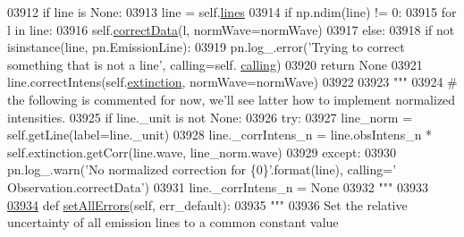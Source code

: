 \begin{DoxyCode}
{{{{{{{{{{{{{{{{{{{{{{03912         \textcolor{keywordflow}{if} line \textcolor{keywordflow}{is} \textcolor{keywordtype}{None}:
03913             line = self.\hyperlink{classpyneb_1_1core_1_1pynebcore_1_1_observation_a78332043ca9f290590edf6b8a1e5b767}{lines}
03914         \textcolor{keywordflow}{if} np.ndim(line) != 0:
03915             \textcolor{keywordflow}{for} l \textcolor{keywordflow}{in} line:
03916                 self.\hyperlink{classpyneb_1_1core_1_1pynebcore_1_1_observation_a823a1fa51f042f2734cbc323c6a7d4bb}{correctData}(l, normWave=normWave)
03917         \textcolor{keywordflow}{else}:
03918             \textcolor{keywordflow}{if} \textcolor{keywordflow}{not} isinstance(line, pn.EmissionLine):
03919                 pn.log\_.error(\textcolor{stringliteral}{'Trying to correct something that is not a line'}, calling=self.
      \hyperlink{classpyneb_1_1core_1_1pynebcore_1_1_observation_a2639fad9af4fefad20e4097295bd40e7}{calling})
03920                 \textcolor{keywordflow}{return} \textcolor{keywordtype}{None}  
03921             line.correctIntens(self.\hyperlink{classpyneb_1_1core_1_1pynebcore_1_1_observation_acdd6227c32bd92ec4a15b83110bcb570}{extinction}, normWave=normWave)
03922 
03923             \textcolor{stringliteral}{"""            }
03924 \textcolor{stringliteral}{            # the following is commented for now, we'll see latter how to implement normalized intensities.}
03925 \textcolor{stringliteral}{            if line.\_unit is not None:}
03926 \textcolor{stringliteral}{                try:}
03927 \textcolor{stringliteral}{                    line\_norm = self.getLine(label=line.\_unit)}
03928 \textcolor{stringliteral}{                    line.\_corrIntens\_n = line.obsIntens\_n * self.extinction.getCorr(line.wave,
       line\_norm.wave)}
03929 \textcolor{stringliteral}{                except:}
03930 \textcolor{stringliteral}{                    pn.log\_.warn('No normalized correction for \{0\}'.format(line), calling='
      Observation.correctData')}
03931 \textcolor{stringliteral}{                    line.\_corrIntens\_n = None}
03932 \textcolor{stringliteral}{            """}
03933             
\hypertarget{pynebcore_8py_source_l03934}{}\hyperlink{classpyneb_1_1core_1_1pynebcore_1_1_observation_aa0f98ae4395e7dfa586bcd71d32e43f1}{03934}     \textcolor{keyword}{def }\hyperlink{classpyneb_1_1core_1_1pynebcore_1_1_observation_aa0f98ae4395e7dfa586bcd71d32e43f1}{setAllErrors}(self, err\_default):
03935         \textcolor{stringliteral}{"""}
03936 \textcolor{stringliteral}{        Set the relative uncertainty of all emission lines to a common constant value}
}}}}}}}}}}}}}}}}}}}}}}
\end{DoxyCode}
